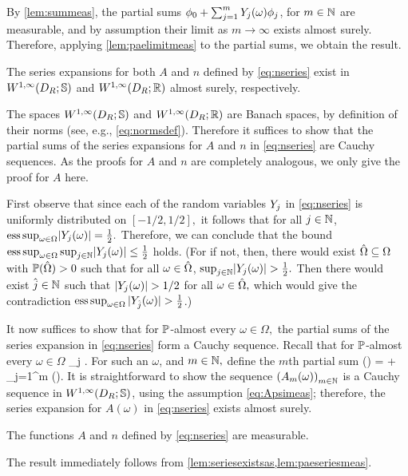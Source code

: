 By \cref{lem:summeas}, the partial sums $\phi_0 + \sum_{j=1}^m Y_{j}(\omega)\phi_j$, for $m \in \mathbb N$ are measurable, and by assumption their limit as $m \rightarrow \infty$ exists almost surely. Therefore, applying \cref{lem:paelimitmeas} to the partial sums, we obtain the result.
\epf

\ble\label{lem:seriesexistsas}
The series expansions for both $A$ and $n$ defined by \eqref{eq:nseries} exist in $\WoiDRRRdtd$ and $\WoiDRRR$ almost surely, respectively.
\ele

The spaces $\WoiDRRRdtd$ and $\WoiDRRR$ are Banach spaces, by definition of their norms (see, e.g., \eqref{eq:normsdef}). Therefore it suffices to show that the partial sums of the series expansions for $A$ and $n$ in \eqref{eq:nseries} are Cauchy sequences. As the proofs for $A$ and $n$ are completely analogous, we only give the proof for $A$ here.

First observe that since each of the random variables $Y_{j}$ in \eqref{eq:nseries} is uniformly distributed on $[-1/2,1/2],$ it follows that for all $j \in \mathbb N$, $\esssup_{\omega \in \Omega} \abs{\Yj(\omega)} = \frac12.$
Therefore, we can conclude that the bound $\esssup_{\omega \in \Omega} \sup_{j \in \NN} \abs{\Yj(\omega)} \leq \half$ holds.
(For if not, then, there would exist $\hat{\Omega} \subseteq \Omega$ with $\mathbb P(\hat{\Omega}) > 0$ such that for all $\omega \in \hat{\Omega}$, $\sup_{j \in \NN} \abs{\Yj(\omega)} > \half.$
Then there would exist $\hat{j} \in \mathbb N$ such that $\abs{\Yj(\omega)} > 1/2$ for all $\omega \in \hat{\Omega},$ which would give the contradiction $\operatorname{ess\,sup}_{\omega \in \Omega} |Y_{\hat{j}}(\omega)| > \frac{1}{2}$.)

It now suffices to show that for $\mathbb P$-almost every $\omega \in \Omega,$ the partial sums of the series expansion in \eqref{eq:nseries} form a Cauchy sequence. Recall that for $\mathbb P$-almost every $\omega \in \Omega$
\beqs
\sup_{j \in \NN} \abs{\Yj(\omega)} \leq \half.
\eeqs
For such an $\omega$, and $m \in \mathbb N,$ define the $m$th partial sum
\beqs
\Am(\omega) = \Az + \sum_{j=1}^m \Yj(\omega)\Psij.
\eeqs
It is straightforward to show the sequence $\mleft(\Am(\omega)\mright)_{m \in \NN}$ is a Cauchy sequence in $\WoiDRRRdtd$, using the assumption \eqref{eq:Apsimeas}; therefore, the series expansion for $A(\omega)$ in \eqref{eq:nseries} exists almost surely.
\epf

\ble\label{lem:seriesmeas}
The functions $A$ and $n$ defined by \eqref{eq:nseries} are measurable.
\ele

The result immediately follows from \cref{lem:seriesexistsas,lem:paeseriesmeas}.
\epf
